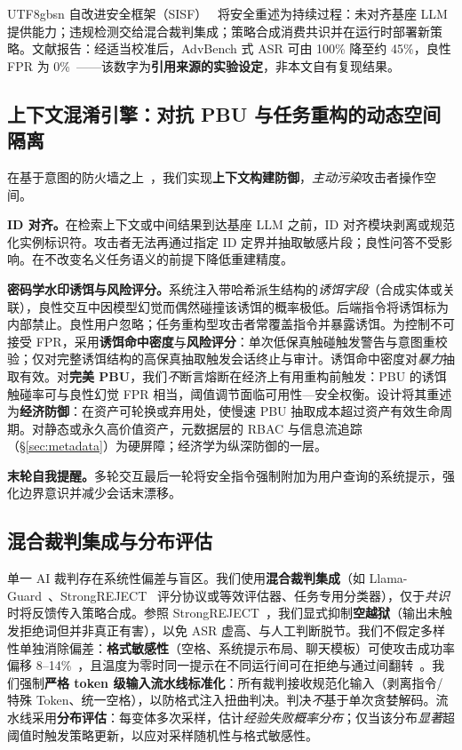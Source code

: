 \documentclass[letterpaper,twocolumn,10pt]{article}
\begin{document}
\begin{CJK}{UTF8}{gbsn}
自改进安全框架（SISF）~\cite{sisf-arxiv} 将安全重述为持续过程：未对齐基座 LLM 提供能力；违规检测交给混合裁判集成；策略合成消费共识并在运行时部署新策略。文献报告：经适当校准后，AdvBench 式 ASR 可由 100\% 降至约 45\%，良性 FPR 为 0\%~\cite{sisf-arxiv}——该数字为\textbf{引用来源的实验设定}，非本文自有复现结果。

\subsection{上下文混淆引擎：对抗 PBU 与任务重构的动态空间隔离}
\label{sec:context-confusion}

在基于意图的防火墙之上~\cite{agentos-arxiv}，我们实现\textbf{上下文构建防御}，\emph{主动污染}攻击者操作空间。

\textbf{ID 对齐。}在检索上下文或中间结果到达基座 LLM 之前，ID 对齐模块剥离或规范化实例标识符。攻击者无法再通过指定 ID 定界并抽取敏感片段；良性问答不受影响。在不改变名义任务语义的前提下降低重建精度。

\textbf{密码学水印诱饵与风险评分。}系统注入带哈希派生结构的\emph{诱饵字段}（合成实体或关联），良性交互中因模型幻觉而偶然碰撞该诱饵的概率极低。后端指令将诱饵标为内部禁止。良性用户忽略；任务重构型攻击者常覆盖指令并暴露诱饵。为控制不可接受 FPR，采用\textbf{诱饵命中密度}与\textbf{风险评分}：单次低保真触碰触发警告与意图重校验；仅对完整诱饵结构的高保真抽取触发会话终止与审计。诱饵命中密度对\emph{暴力}抽取有效。对\textbf{完美 PBU}，我们\emph{不}断言熔断在经济上有用重构前触发：PBU 的诱饵触碰率可与良性幻觉 FPR 相当，阈值调节面临可用性—安全权衡。设计将其重述为\textbf{经济防御}：在资产可轮换或弃用处，使慢速 PBU 抽取成本超过资产有效生命周期。对静态或永久高价值资产，元数据层的 RBAC 与信息流追踪（\S\ref{sec:metadata}）为硬屏障；经济学为纵深防御的一层。

\textbf{末轮自我提醒。}多轮交互最后一轮将安全指令强制附加为用户查询的系统提示，强化边界意识并减少会话末漂移。

\subsection{混合裁判集成与分布评估}
\label{sec:judge}

单一 AI 裁判存在系统性偏差与盲区。我们使用\textbf{混合裁判集成}（如 Llama-Guard~\cite{llama-guard}、StrongREJECT~\cite{strongreject} 评分协议或等效评估器、任务专用分类器），仅于\emph{共识}时将反馈传入策略合成。参照 StrongREJECT~\cite{strongreject}，我们显式抑制\textbf{空越狱}（输出未触发拒绝词但并非真正有害），以免 ASR 虚高、与人工判断脱节。我们不假定多样性单独消除偏差：\textbf{格式敏感性}（空格、系统提示布局、聊天模板）可使攻击成功率偏移 8--14\%~\cite{llm-safety-robustness}，且温度为零时同一提示在不同运行间可在拒绝与通过间翻转~\cite{apst}。我们强制\textbf{严格 token 级输入流水线标准化}：所有裁判接收规范化输入（剥离指令/特殊 Token、统一空格），以防格式注入扭曲判决。判决\emph{不}基于单次贪婪解码。流水线采用\textbf{分布评估}：每变体多次采样，估计\emph{经验失败概率分布}；仅当该分布\emph{显著}超阈值时触发策略更新，以应对采样随机性与格式敏感性。


\end{CJK}
\end{document}
